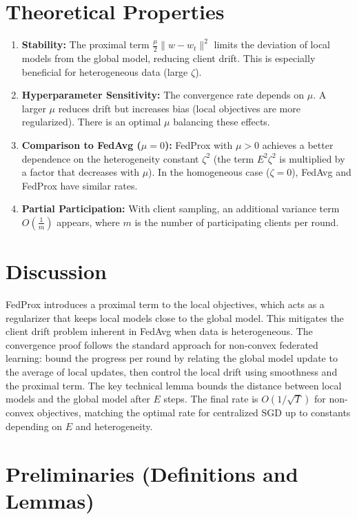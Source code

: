 \documentclass{article}
\begin{document}
\section*{Theoretical Properties}

\begin{enumerate}
    \item \textbf{Stability:} The proximal term $\frac{\mu}{2}\|w - w_t\|^2$ limits the deviation of local models from the global model, reducing client drift. This is especially beneficial for heterogeneous data (large $\zeta$).
    \item \textbf{Hyperparameter Sensitivity:} The convergence rate depends on $\mu$. A larger $\mu$ reduces drift but increases bias (local objectives are more regularized). There is an optimal $\mu$ balancing these effects.
    \item \textbf{Comparison to FedAvg ($\mu=0$):} FedProx with $\mu>0$ achieves a better dependence on the heterogeneity constant $\zeta^2$ (the term $E^2\zeta^2$ is multiplied by a factor that decreases with $\mu$). In the homogeneous case ($\zeta=0$), FedAvg and FedProx have similar rates.
    \item \textbf{Partial Participation:} With client sampling, an additional variance term $O(\frac{1}{m})$ appears, where $m$ is the number of participating clients per round.
\end{enumerate}

\section*{Discussion}

FedProx introduces a proximal term to the local objectives, which acts as a regularizer that keeps local models close to the global model. This mitigates the client drift problem inherent in FedAvg when data is heterogeneous. The convergence proof follows the standard approach for non-convex federated learning: bound the progress per round by relating the global model update to the average of local updates, then control the local drift using smoothness and the proximal term. The key technical lemma bounds the distance between local models and the global model after $E$ steps. The final rate is $O(1/\sqrt{T})$ for non-convex objectives, matching the optimal rate for centralized SGD up to constants depending on $E$ and heterogeneity.

\section*{Preliminaries (Definitions and Lemmas)}
\end{document}
